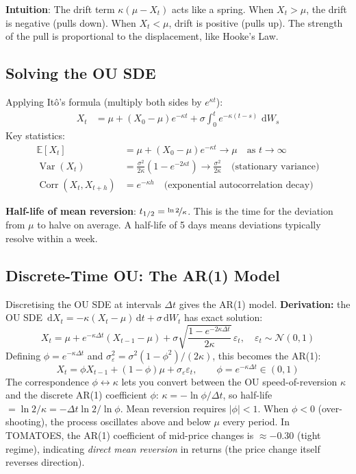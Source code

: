 \documentclass[12pt,a4paper,openany]{report}
\theoremstyle{definition}
\newcommand{\E}{\mathbb{E}}
\newcommand{\Var}{\operatorname{Var}}
\newcommand{\Corr}{\operatorname{Corr}}
\newcommand{\dd}{\,\mathrm{d}}
\begin{document}
\textbf{Intuition}: The drift term $\kappa(\mu - X_t)$ acts like a spring. When $X_t > \mu$, the drift is negative (pulls down). When $X_t < \mu$, drift is positive (pulls up). The strength of the pull is proportional to the displacement, like Hooke's Law.

\subsection{Solving the OU SDE}

Applying Itô's formula (multiply both sides by $e^{\kappa t}$):
\begin{align}
  X_t &= \mu + (X_0 - \mu)e^{-\kappa t} + \sigma\int_0^t e^{-\kappa(t-s)}\,\dd W_s
\end{align}
Key statistics:
\begin{align}
  \E[X_t] &= \mu + (X_0 - \mu)e^{-\kappa t} \to \mu \quad \text{as } t \to \infty \\
  \Var(X_t) &= \frac{\sigma^2}{2\kappa}\left(1 - e^{-2\kappa t}\right) \to \frac{\sigma^2}{2\kappa} \quad \text{(stationary variance)} \\
  \Corr(X_t, X_{t+h}) &= e^{-\kappa h} \quad \text{(exponential autocorrelation decay)}
\end{align}

\textbf{Half-life of mean reversion}: $t_{1/2} = \nicefrac{\ln 2}{\kappa}$. This is the time for the deviation from $\mu$ to halve on average. A half-life of 5 days means deviations typically resolve within a week.

\subsection{Discrete-Time OU: The AR(1) Model}

Discretising the OU SDE at intervals $\Delta t$ gives the AR(1) model. \textbf{Derivation:} the OU SDE $\dd X_t = -\kappa(X_t - \mu)\dd t + \sigma\dd W_t$ has exact solution:
\[
  X_t = \mu + e^{-\kappa\Delta t}(X_{t-1} - \mu) + \sigma\sqrt{\frac{1-e^{-2\kappa\Delta t}}{2\kappa}}\,\varepsilon_t, \quad \varepsilon_t \sim \mathcal{N}(0,1)
\]
Defining $\phi = e^{-\kappa\Delta t}$ and $\sigma_\varepsilon^2 = \sigma^2(1-\phi^2)/(2\kappa)$, this becomes the AR(1):
\[
  X_t = \phi X_{t-1} + (1-\phi)\mu + \sigma_\varepsilon\varepsilon_t, \qquad \phi = e^{-\kappa\Delta t} \in (0,1)
\]
The correspondence $\phi \leftrightarrow \kappa$ lets you convert between the OU speed-of-reversion $\kappa$ and the discrete AR(1) coefficient $\phi$: $\kappa = -\ln\phi/\Delta t$, so half-life $= \ln 2/\kappa = -\Delta t\ln 2/\ln\phi$. Mean reversion requires $|\phi| < 1$. When $\phi < 0$ (over-shooting), the process oscillates above and below $\mu$ every period. In TOMATOES, the AR(1) coefficient of mid-price changes is $\approx -0.30$ (tight regime), indicating \emph{direct mean reversion} in returns (the price change itself reverses direction).
\end{document}
